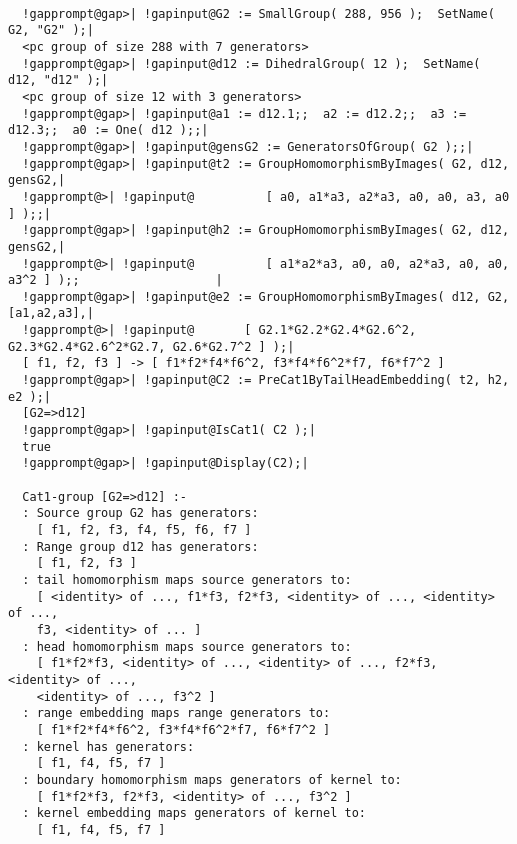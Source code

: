 \documentclass[a4paper,11pt]{report}
\begin{document}
{{ 

 
\begin{Verbatim}[commandchars=!@|,fontsize=\small,frame=single,label=Example]
  
  !gapprompt@gap>| !gapinput@G2 := SmallGroup( 288, 956 );  SetName( G2, "G2" );|
  <pc group of size 288 with 7 generators>
  !gapprompt@gap>| !gapinput@d12 := DihedralGroup( 12 );  SetName( d12, "d12" );|
  <pc group of size 12 with 3 generators>
  !gapprompt@gap>| !gapinput@a1 := d12.1;;  a2 := d12.2;;  a3 := d12.3;;  a0 := One( d12 );;|
  !gapprompt@gap>| !gapinput@gensG2 := GeneratorsOfGroup( G2 );;|
  !gapprompt@gap>| !gapinput@t2 := GroupHomomorphismByImages( G2, d12, gensG2,|
  !gapprompt@>| !gapinput@          [ a0, a1*a3, a2*a3, a0, a0, a3, a0 ] );;|
  !gapprompt@gap>| !gapinput@h2 := GroupHomomorphismByImages( G2, d12, gensG2,|
  !gapprompt@>| !gapinput@          [ a1*a2*a3, a0, a0, a2*a3, a0, a0, a3^2 ] );;                   |
  !gapprompt@gap>| !gapinput@e2 := GroupHomomorphismByImages( d12, G2, [a1,a2,a3],|
  !gapprompt@>| !gapinput@       [ G2.1*G2.2*G2.4*G2.6^2, G2.3*G2.4*G2.6^2*G2.7, G2.6*G2.7^2 ] );|
  [ f1, f2, f3 ] -> [ f1*f2*f4*f6^2, f3*f4*f6^2*f7, f6*f7^2 ]
  !gapprompt@gap>| !gapinput@C2 := PreCat1ByTailHeadEmbedding( t2, h2, e2 );|
  [G2=>d12]
  !gapprompt@gap>| !gapinput@IsCat1( C2 );|
  true
  !gapprompt@gap>| !gapinput@Display(C2);|
  
  Cat1-group [G2=>d12] :- 
  : Source group G2 has generators:
    [ f1, f2, f3, f4, f5, f6, f7 ]
  : Range group d12 has generators:
    [ f1, f2, f3 ]
  : tail homomorphism maps source generators to:
    [ <identity> of ..., f1*f3, f2*f3, <identity> of ..., <identity> of ..., 
    f3, <identity> of ... ]
  : head homomorphism maps source generators to:
    [ f1*f2*f3, <identity> of ..., <identity> of ..., f2*f3, <identity> of ..., 
    <identity> of ..., f3^2 ]
  : range embedding maps range generators to:
    [ f1*f2*f4*f6^2, f3*f4*f6^2*f7, f6*f7^2 ]
  : kernel has generators:
    [ f1, f4, f5, f7 ]
  : boundary homomorphism maps generators of kernel to:
    [ f1*f2*f3, f2*f3, <identity> of ..., f3^2 ]
  : kernel embedding maps generators of kernel to:
    [ f1, f4, f5, f7 ]
  
  
\end{Verbatim}
 

}}
\end{document}
